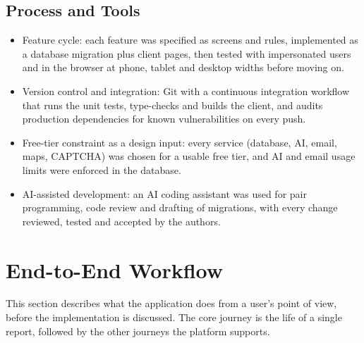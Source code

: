 \documentclass[conference]{IEEEtran}
\begin{document}
\subsection{Process and Tools}
\begin{itemize}
\item Feature cycle: each feature was specified as screens and rules, implemented as a database migration plus client pages, then tested with impersonated users and in the browser at phone, tablet and desktop widths before moving on.
\item Version control and integration: Git with a continuous integration workflow that runs the unit tests, type-checks and builds the client, and audits production dependencies for known vulnerabilities on every push.
\item Free-tier constraint as a design input: every service (database, AI, email, maps, CAPTCHA) was chosen for a usable free tier, and AI and email usage limits were enforced in the database.
\item AI-assisted development: an AI coding assistant was used for pair programming, code review and drafting of migrations, with every change reviewed, tested and accepted by the authors.
\end{itemize}
\section{End-to-End Workflow}
This section describes what the application does from a user's point of view, before the implementation is discussed. The core journey is the life of a single report, followed by the other journeys the platform supports.
\end{document}
